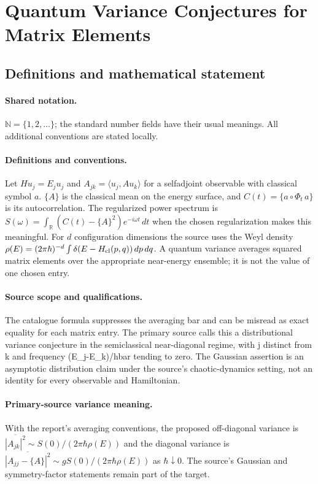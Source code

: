 \documentclass[11pt]{article}
\begin{document}
\section{Quantum Variance Conjectures for Matrix Elements}\label{statement}

\subsection{Definitions and mathematical statement}

\paragraph{Shared notation.}$\mathbb N=\{1,2,\ldots\}$; the standard number fields have their usual meanings. All additional conventions are stated locally.


\paragraph{Definitions and conventions.} Let $Hu_j=E_ju_j$ and $A_{jk}=\langle u_j,Au_k\rangle$ for a selfadjoint observable with classical symbol $a$. $\{A\}$ is the classical mean on the energy surface, and $C(t)=\{a\circ\Phi_t\,a\}$ is its autocorrelation. The regularized power spectrum is $S(\omega)=\int_{\mathbb R}(C(t)-\{A\}^2)e^{-i\omega t}\,dt$ when the chosen regularization makes this meaningful. For $d$ configuration dimensions the source uses the Weyl density $\rho(E)=(2\pi\hbar)^{-d}\int\delta(E-H_{\rm cl}(p,q))\,dp\,dq$. A quantum variance averages squared matrix elements over the appropriate near-energy ensemble; it is not the value of one chosen entry.

\paragraph{Source scope and qualifications.} The catalogue formula suppresses the averaging bar and can be misread as exact equality for each matrix entry. The primary source calls this a distributional variance conjecture in the semiclassical near-diagonal regime, with j distinct from k and frequency (E\_j-E\_k)/hbar tending to zero. The Gaussian assertion is an asymptotic distribution claim under the source's chaotic-dynamics setting, not an identity for every observable and Hamiltonian.

\paragraph{Primary-source variance meaning.} With the report's averaging conventions, the proposed off-diagonal variance is $\overline{|A_{jk}|^2}\sim S(0)/(2\pi\hbar\rho(E))$ and the diagonal variance is $\overline{|A_{jj}-\{A\}|^2}\sim gS(0)/(2\pi\hbar\rho(E))$ as $\hbar\downarrow0$. The source's Gaussian and symmetry-factor statements remain part of the target.
\end{document}

